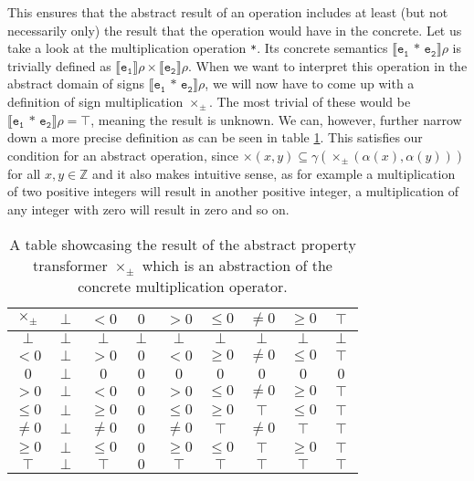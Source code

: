 

\noindent This ensures that the abstract result of an operation includes at least (but not necessarily only) the result that the operation would have in the concrete. Let us take a look at the multiplication operation \texttt{*}. Its concrete semantics $\llbracket\mathtt{e_1\texttt{ * } e_2}\rrbracket\rho$ is trivially defined as $\llbracket\mathtt{e_1}\rrbracket\rho \times\llbracket\mathtt{e_2}\rrbracket\rho$. When we want to interpret this operation in the abstract domain of signs $\llbracket\mathtt{e_1\texttt{ * } e_2}\rrbracket\rho$, we will now have to come up with a definition of sign multiplication $\times_\pm$. The most trivial of these would be $\llbracket\mathtt{e_1\texttt{ * } e_2}\rrbracket\rho=\top$, meaning the result is unknown. We can, however, further narrow down a more precise definition as can be seen in table \ref{table:multiply}. This satisfies our condition for an abstract operation, since $\times(x,y)\subseteq\gamma(\times_\pm(\alpha(x),\alpha(y)))$ for all $x,y\in\mathbb{Z}$ and it also makes intuitive sense, as for example a multiplication of two positive integers will result in another positive integer, a multiplication of any integer with zero will result in zero and so on.


\begin{table}[hbt]
\begin{center}
\begin{tabular}{c|c|c|c|c|c|c|c|c}
            $\times_\pm$& $\perp$ & $<0$    & $0$     & $>0$    & $\leq0$ & $\neq0$ & $\geq0$ & $\top$  \\ \hline
            $\perp$ & $\perp$ & $\perp$ & $\perp$ & $\perp$ & $\perp$ & $\perp$ & $\perp$ & $\perp$ \\
            $<0$    & $\perp$ & $>0$    & $0$     & $<0$    & $\geq0$ & $\neq0$ & $\leq0$ & $\top$  \\
            $0$     & $\perp$ & $0$     & $0$     & $0$     & $0$     & $0$     & $0$     & $0$     \\
            $>0$    & $\perp$ & $<0$    & $0$     & $>0$    & $\leq0$ & $\neq0$ & $\geq0$ & $\top$  \\
            $\leq0$ & $\perp$ & $\geq0$ & $0$     & $\leq0$ & $\geq0$ & $\top$  & $\leq0$ & $\top$  \\
            $\neq0$ & $\perp$ & $\neq0$ & $0$     & $\neq0$ & $\top$  & $\neq0$ & $\top$  & $\top$  \\
            $\geq0$ & $\perp$ & $\leq0$ & $0$     & $\geq0$ & $\leq0$ & $\top$  & $\geq0$ & $\top$  \\
            $\top$  & $\perp$ & $\top$  & $0$     & $\top$  & $\top$  & $\top$  & $\top$  & $\top$ 
        \end{tabular}
  \caption{A table showcasing the result of the abstract property transformer $\times_\pm$ which is an abstraction of the concrete multiplication operator.}\label{table:multiply}
  \end{center}
\end{table}

